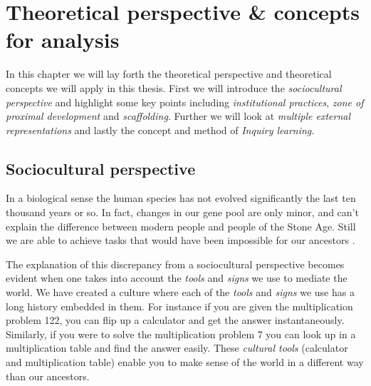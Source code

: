 \chapter{Theoretical perspective \& concepts for analysis}

In this chapter we will lay forth the theoretical perspective and theoretical concepts we will apply in this thesis. First we will introduce the \emph{sociocultural perspective} and highlight some key points including \emph{institutional practices}, \emph{zone of proximal development} and \emph{scaffolding}. Further we will look at \emph{multiple external representations} and lastly the concept and method of \emph{Inquiry learning}.

\section{Sociocultural perspective}




In a biological sense the human species has not evolved significantly the last ten thousand years or so. In fact, changes in our gene pool are only minor, and can’t explain the difference between modern people and people of the Stone Age. Still we are able to achieve tasks that would have been impossible for our ancestors \citep{saljo2001laering}.

The explanation of this discrepancy from a sociocultural perspective becomes evident when one takes into account the \emph{tools} and \emph{signs} we use to mediate the world. We have created a culture where each of the \emph{tools} and \emph{signs} we use has a long history embedded in them. For instance if you are given the multiplication problem 122, you can flip up a calculator and get the answer instantaneously. Similarly, if you were to solve the multiplication problem 7 you can look up in a multiplication table and find the answer easily. These \emph{cultural tools} (calculator and multiplication table) enable you to make sense of the world in a different way than our ancestors. 

